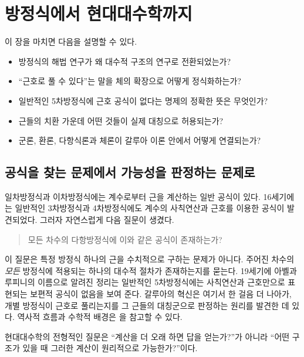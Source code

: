 \chapter{방정식에서 현대대수학까지}
\label{chap:motivation}

\begin{learninggoal}
이 장을 마치면 다음을 설명할 수 있다.
\begin{itemize}
  \item 방정식의 해법 연구가 왜 대수적 구조의 연구로 전환되었는가?
  \item ``근호로 풀 수 있다''는 말을 체의 확장으로 어떻게 정식화하는가?
  \item 일반적인 5차방정식에 근호 공식이 없다는 명제의 정확한 뜻은 무엇인가?
  \item 근들의 치환 가운데 어떤 것들이 실제 대칭으로 허용되는가?
  \item 군론, 환론, 다항식론과 체론이 갈루아 이론 안에서 어떻게 연결되는가?
\end{itemize}
\end{learninggoal}

\section{공식을 찾는 문제에서 가능성을 판정하는 문제로}

일차방정식과 이차방정식에는 계수로부터 근을 계산하는 일반 공식이 있다. 16세기에는 일반적인 3차방정식과 4차방정식에도 계수의 사칙연산과 근호를 이용한 공식이 발견되었다. 그러자 자연스럽게 다음 질문이 생겼다.

\begin{quote}
모든 차수의 다항방정식에 이와 같은 공식이 존재하는가?
\end{quote}

이 질문은 특정 방정식 하나의 근을 수치적으로 구하는 문제가 아니다. 주어진 차수의 \emph{모든} 방정식에 적용되는 하나의 대수적 절차가 존재하는지를 묻는다. 19세기에 아벨과 루피니의 이름으로 알려진 정리는 일반적인 5차방정식에는 사칙연산과 근호만으로 표현되는 보편적 공식이 없음을 보여 준다. 갈루아의 혁신은 여기서 한 걸음 더 나아가, 개별 방정식이 근호로 풀리는지를 그 근들의 대칭군으로 판정하는 원리를 발견한 데 있다. 역사적 흐름과 수학적 배경은 \cite{bosch,tignol}을 참고할 수 있다.

\begin{keyidea}
현대대수학의 전형적인 질문은 ``계산을 더 오래 하면 답을 얻는가?''가 아니라 ``어떤 구조가 있을 때 그러한 계산이 원리적으로 가능한가?''이다.
\end{keyidea}

